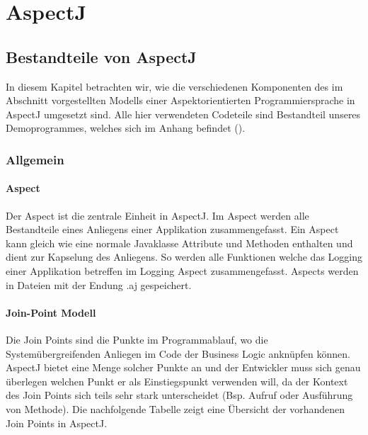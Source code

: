 \chapter{AspectJ}
\label{chap:aspectj}
\section{Bestandteile von AspectJ}
In diesem Kapitel betrachten wir, wie die verschiedenen Komponenten des im Abschnitt  vorgestellten Modells einer Aspektorientierten Programmiersprache in AspectJ umgesetzt sind. Alle hier verwendeten Codeteile sind Bestandteil unseres Demoprogrammes, welches sich im Anhang befindet ().

\subsection{Allgemein}
\subsubsection{Aspect}
Der Aspect ist die zentrale Einheit in AspectJ. Im Aspect werden alle Bestandteile eines Anliegens einer Applikation zusammengefasst. Ein Aspect kann gleich wie eine normale Javaklasse Attribute und Methoden enthalten und dient zur Kapselung des Anliegens. So werden alle Funktionen welche das Logging einer Applikation betreffen im Logging Aspect zusammengefasst. Aspects werden in Dateien mit der Endung .aj gespeichert.


\subsubsection{Join-Point Modell}
Die Join Points sind die Punkte im Programmablauf, wo die Systemübergreifenden Anliegen im Code der Business Logic anknüpfen können. AspectJ bietet eine Menge solcher Punkte an und der Entwickler muss sich genau überlegen welchen Punkt er als Einstiegspunkt verwenden will, da der Kontext des Join Points sich teils sehr stark unterscheidet (Bsp. Aufruf oder Ausführung von Methode). Die nachfolgende Tabelle zeigt eine Übersicht der vorhandenen Join Points in AspectJ.

